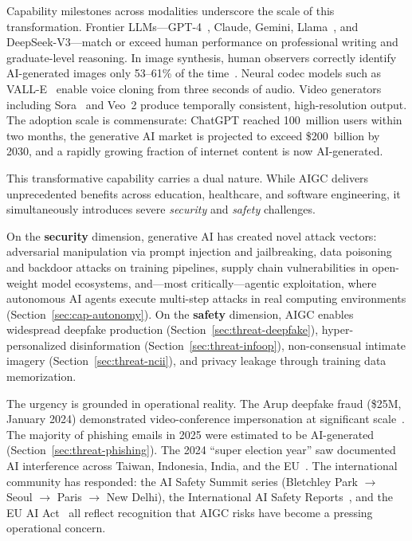 Capability milestones across modalities underscore the scale of this transformation. Frontier LLMs---GPT-4~\cite{gpt4}, Claude, Gemini, Llama~\cite{llama3}, and DeepSeek-V3---match or exceed human performance on professional writing and graduate-level reasoning. In image synthesis, human observers correctly identify AI-generated images only 53--61\% of the time~\cite{microsoft2025human}. Neural codec models such as VALL-E~\cite{wang2023valle} enable voice cloning from three seconds of audio. Video generators including Sora~\cite{brooks2024sora} and Veo~2 produce temporally consistent, high-resolution output. The adoption scale is commensurate: ChatGPT reached 100~million users within two months, the generative AI market is projected to exceed \$200~billion by 2030, and a rapidly growing fraction of internet content is now AI-generated.


This transformative capability carries a dual nature. While AIGC delivers unprecedented benefits across education, healthcare, and software engineering, it simultaneously introduces severe \emph{security} and \emph{safety} challenges.

On the \textbf{security} dimension, generative AI has created novel attack vectors: adversarial manipulation via prompt injection and jailbreaking, data poisoning and backdoor attacks on training pipelines, supply chain vulnerabilities in open-weight model ecosystems, and---most critically---agentic exploitation, where autonomous AI agents execute multi-step attacks in real computing environments (Section~\ref{sec:cap-autonomy}). On the \textbf{safety} dimension, AIGC enables widespread deepfake production (Section~\ref{sec:threat-deepfake}), hyper-personalized disinformation (Section~\ref{sec:threat-infoop}), non-consensual intimate imagery (Section~\ref{sec:threat-ncii}), and privacy leakage through training data memorization.

The urgency is grounded in operational reality. The Arup deepfake fraud (\$25M, January 2024) demonstrated video-conference impersonation at significant scale~\cite{brightside2025phishing}. The majority of phishing emails in 2025 were estimated to be AI-generated (Section~\ref{sec:threat-phishing}). The 2024 ``super election year'' saw documented AI interference across Taiwan, Indonesia, India, and the EU~\cite{restofworld2024tracker}. The international community has responded: the AI Safety Summit series (Bletchley Park $\to$ Seoul $\to$ Paris $\to$ New Delhi), the International AI Safety Reports~\cite{aisafetyreport2025,aisafetyreport2026}, and the EU AI Act~\cite{euaiact2024} all reflect recognition that AIGC risks have become a pressing operational concern.

